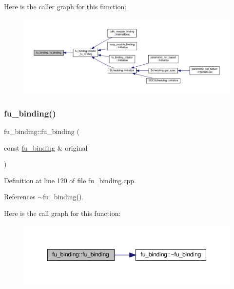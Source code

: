 Here is the caller graph for this function\+:
\nopagebreak
\begin{figure}[H]
\begin{center}
\leavevmode
\includegraphics[width=350pt]{d8/d04/classfu__binding_ae6f6e61df5b1e24b034cd0907570557d_icgraph}
\end{center}
\end{figure}
\mbox{\label{classfu__binding_ad3c9159e25572998ed6811545486ed2f}} 
\subsubsection{\texorpdfstring{fu\+\_\+binding()}{fu\_binding()}\hspace{0.1cm}{\footnotesize\ttfamily [2/2]}}
{\footnotesize\ttfamily fu\+\_\+binding\+::fu\+\_\+binding (\begin{DoxyParamCaption}\item[{const \hyperlink{classfu__binding}{fu\+\_\+binding} \&}]{original }\end{DoxyParamCaption})}



Definition at line 120 of file fu\+\_\+binding.\+cpp.



References $\sim$fu\+\_\+binding().

Here is the call graph for this function\+:
\nopagebreak
\begin{figure}[H]
\begin{center}
\leavevmode
\includegraphics[width=344pt]{d8/d04/classfu__binding_ad3c9159e25572998ed6811545486ed2f_cgraph}
\end{center}
\end{figure}
\mbox{\label{classfu__binding_a95e352799ea02609e978752ade999c22}} 
